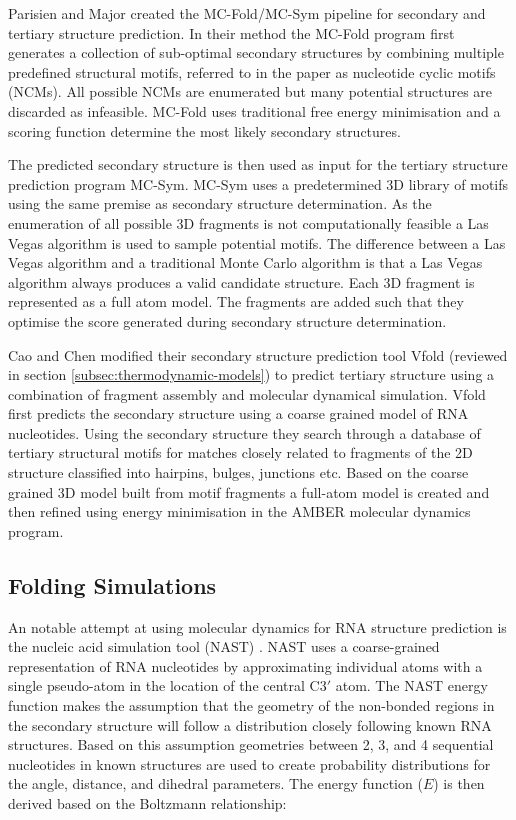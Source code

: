 \documentclass[journal]{IEEEtran}
\begin{document}
Parisien and Major\cite{parisien2008mc} created the MC-Fold/MC-Sym pipeline for secondary and tertiary structure prediction. In their method the MC-Fold program first generates a collection of sub-optimal secondary structures by combining multiple predefined structural motifs, referred to in the paper as nucleotide cyclic motifs (NCMs). All possible NCMs are enumerated but many potential structures are discarded as infeasible. MC-Fold uses traditional free energy minimisation and a scoring function determine the most likely secondary structures.

The predicted secondary structure is then used as input for the tertiary structure prediction program MC-Sym. MC-Sym uses a predetermined 3D library of motifs using the same premise as secondary structure determination. As the enumeration of all possible 3D fragments is not computationally feasible a Las Vegas algorithm is used to sample potential motifs. The difference between a Las Vegas algorithm and a traditional Monte Carlo algorithm is that a Las Vegas algorithm always produces a valid candidate structure. Each 3D fragment is represented as a full atom model. The fragments are added such that they optimise the score generated during secondary structure determination.

Cao and Chen \cite{cao2011physics} modified their secondary structure prediction tool Vfold \cite{cao2005predicting} (reviewed in section \ref{subsec:thermodynamic-models}) to predict tertiary structure using a combination of fragment assembly and molecular dynamical simulation. Vfold first predicts the secondary structure using a coarse grained model of RNA nucleotides. Using the secondary structure they search through a database of tertiary structural motifs for matches closely related to fragments of the 2D structure classified into hairpins, bulges, junctions etc. Based on the coarse grained 3D model built from motif fragments a full-atom model is created and then refined using energy minimisation in the AMBER \cite{case2010amber}  molecular dynamics program. 

\subsection{Folding Simulations}
An notable attempt at using molecular dynamics for RNA structure prediction is the nucleic acid simulation tool (NAST) \cite{jonikas2009coarse}. NAST uses a coarse-grained representation of RNA nucleotides by approximating individual atoms with a single pseudo-atom in the location of the central C3$'$ atom. The NAST energy function makes the assumption that the geometry of the non-bonded regions in the secondary structure will follow a distribution closely following known RNA structures. Based on this assumption geometries between 2, 3, and 4 sequential nucleotides in known structures are used to create probability distributions for the angle, distance, and dihedral parameters. The energy function ($E$) is then derived based on the Boltzmann relationship:
\end{document}
